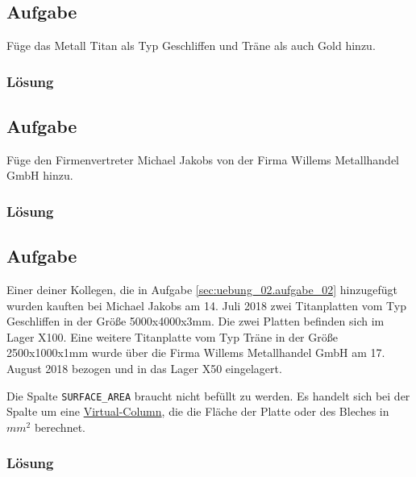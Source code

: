 \subsection{Aufgabe}
\label{sec:uebung_02.aufgabe_04}
Füge das Metall Titan als Typ Geschliffen und Träne als auch Gold hinzu.

\subsubsection*{Lösung}
\label{sec:uebung_02.aufgabe_04.loesung}

\subsection{Aufgabe}
\label{sec:uebung_02.aufgabe_05}
Füge den Firmenvertreter Michael Jakobs von der Firma Willems Metallhandel GmbH hinzu.

\subsubsection*{Lösung}
\label{sec:uebung_02.aufgabe_05.loesung}

\subsection{Aufgabe}
\label{sec:uebung_02.aufgabe_06}
Einer deiner Kollegen, die in Aufgabe \ref{sec:uebung_02.aufgabe_02} hinzugefügt wurden kauften bei Michael Jakobs am 14. Juli 2018 zwei Titanplatten vom Typ Geschliffen in der Größe 5000x4000x3mm. Die zwei Platten befinden sich im Lager X100. Eine weitere Titanplatte vom Typ Träne in der Größe 2500x1000x1mm wurde über die Firma  Willems Metallhandel GmbH am 17. August 2018 bezogen und in das Lager X50 eingelagert.

\begin{info-popup}
  Die Spalte \texttt{SURFACE\_AREA} braucht nicht befüllt zu werden. Es handelt sich bei der Spalte um eine \href{https://oracle-base.com/articles/11g/virtual-columns-11gr1}{Virtual-Column}, die die Fläche der Platte oder des Bleches in $mm^2$ berechnet.
\end{info-popup}

\subsubsection*{Lösung}
\label{sec:uebung_02.aufgabe_06.loesung}

